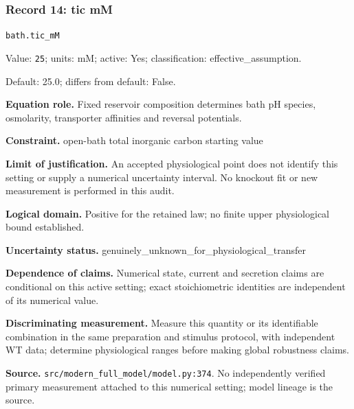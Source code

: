 \subsubsection*{Record 14: tic mM}
{\small \nolinkurl{bath.tic_mM}\par

Value: \texttt{25}; units: mM; active: Yes; classification: effective\_assumption.\par

Default: 25.0; differs from default: False.\par

\textbf{Equation role.} Fixed reservoir composition determines bath pH species, osmolarity, transporter affinities and reversal potentials.\par

\textbf{Constraint.} open-bath total inorganic carbon starting value\par

\textbf{Limit of justification.} An accepted physiological point does not identify this setting or supply a numerical uncertainty interval. No knockout fit or new measurement is performed in this audit.\par

\textbf{Logical domain.} Positive for the retained law; no finite upper physiological bound established.\par

\textbf{Uncertainty status.} genuinely\_unknown\_for\_physiological\_transfer\par

\textbf{Dependence of claims.} Numerical state, current and secretion claims are conditional on this active setting; exact stoichiometric identities are independent of its numerical value.\par

\textbf{Discriminating measurement.} Measure this quantity or its identifiable combination in the same preparation and stimulus protocol, with independent WT data; determine physiological ranges before making global robustness claims.\par

\textbf{Source.} \nolinkurl{src/modern_full_model/model.py:374}. No independently verified primary measurement attached to this numerical setting; model lineage is the source.\par}

